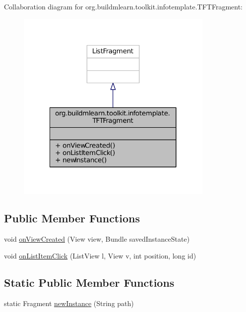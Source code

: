 Collaboration diagram for org.\-buildmlearn.\-toolkit.\-infotemplate.\-T\-F\-T\-Fragment\-:
\nopagebreak
\begin{figure}[H]
\begin{center}
\leavevmode
\includegraphics[width=270pt]{da/de1/classorg_1_1buildmlearn_1_1toolkit_1_1infotemplate_1_1TFTFragment__coll__graph}
\end{center}
\end{figure}
\subsection*{Public Member Functions}
\begin{DoxyCompactItemize}
\item 
void \hyperlink{classorg_1_1buildmlearn_1_1toolkit_1_1infotemplate_1_1TFTFragment_a4a4867cab61afa60ca86661876849ec1}{on\-View\-Created} (View view, Bundle saved\-Instance\-State)
\item 
void \hyperlink{classorg_1_1buildmlearn_1_1toolkit_1_1infotemplate_1_1TFTFragment_aac170e3f71bbcbb03c445c6afc5c43e0}{on\-List\-Item\-Click} (List\-View l, View v, int position, long id)
\end{DoxyCompactItemize}
\subsection*{Static Public Member Functions}
\begin{DoxyCompactItemize}
\item 
static Fragment \hyperlink{classorg_1_1buildmlearn_1_1toolkit_1_1infotemplate_1_1TFTFragment_a519c0a4b7f3645327c1dff061d6c1226}{new\-Instance} (String path)
\end{DoxyCompactItemize}


